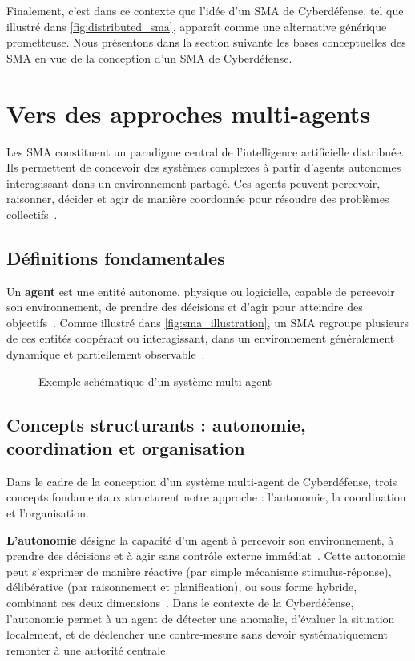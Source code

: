\noindent
Finalement, c'est dans ce contexte que l'idée d'un \ac{SMA} de Cyberdéfense, tel que illustré dans \autoref{fig:distributed_sma}, apparaît comme une alternative générique prometteuse. Nous présentons dans la section suivante les bases conceptuelles des \ac{SMA} en vue de la conception d'un \ac{SMA} de Cyberdéfense.

\section{Vers des approches multi-agents}\label{sec:sma-concepts}

Les \ac{SMA} constituent un paradigme central de l'intelligence artificielle distribuée. Ils permettent de concevoir des systèmes complexes à partir d'agents autonomes interagissant dans un environnement partagé. Ces agents peuvent percevoir, raisonner, décider et agir de manière coordonnée pour résoudre des problèmes collectifs~\cite{Ferber1999,Wooldridge2002}.

\subsection*{Définitions fondamentales}

Un \textbf{agent} est une entité autonome, physique ou logicielle, capable de percevoir son environnement, de prendre des décisions et d'agir pour atteindre des objectifs~\cite{Russell2010}. Comme illustré dans \autoref{fig:sma_illustration}, un \ac{SMA} regroupe plusieurs de ces entités coopérant ou interagissant, dans un environnement généralement dynamique et partiellement observable~\cite{Jennings1998,Shoham2007}.

\begin{figure}[h]
    \centering
    \resizebox{\textwidth}{!}{%
        
    }
    \caption{Exemple schématique d'un système multi-agent}
    \label{fig:sma_illustration}
\end{figure}

\subsection*{Concepts structurants : autonomie, coordination et organisation}

Dans le cadre de la conception d'un système multi-agent de Cyberdéfense, trois concepts fondamentaux structurent notre approche : l'autonomie, la coordination et l'organisation.

\textbf{L'autonomie} désigne la capacité d'un agent à percevoir son environnement, à prendre des décisions et à agir sans contrôle externe immédiat~\cite{Russell2010}. Cette autonomie peut s'exprimer de manière réactive (par simple mécanisme stimulus-réponse), délibérative (par raisonnement et planification), ou sous forme hybride, combinant ces deux dimensions~\cite{Georgeff1987}. Dans le contexte de la Cyberdéfense, l'autonomie permet à un agent de détecter une anomalie, d'évaluer la situation localement, et de déclencher une contre-mesure sans devoir systématiquement remonter à une autorité centrale.

